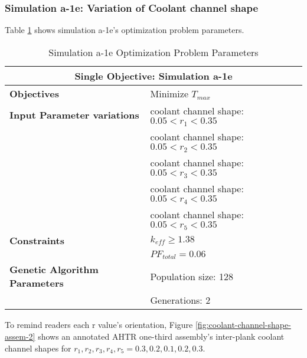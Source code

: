 \subsubsection{Simulation a-1e: Variation of Coolant channel shape}
Table \ref{tab:simulationa1e} shows simulation a-1e's optimization problem parameters. 
\begin{table}[htbp!]
    \centering
    \onehalfspacing
    \caption{Simulation a-1e Optimization Problem Parameters}
	\label{tab:simulationa1e}
    \footnotesize
    \begin{tabular}{l|p{6cm}}
    \hline 
    \multicolumn{2}{c}{\textbf{Single Objective: Simulation a-1e}} \\
    \hline 
    \textbf{Objectives} & Minimize $T_{max}$ \\
    \hline 
    \textbf{Input Parameter variations} 
    & coolant channel shape: $0.05<r_{1}<0.35$ \\
    & coolant channel shape: $0.05<r_{2}<0.35$ \\
    & coolant channel shape: $0.05<r_{3}<0.35$ \\
    & coolant channel shape: $0.05<r_{4}<0.35$ \\
    & coolant channel shape: $0.05<r_{5}<0.35$ \\
    \hline
    \textbf{Constraints} & $k_{eff} \geq 1.38$\\ 
    & $PF_{total} = 0.06 $\\ 
    \hline 
    \textbf{Genetic Algorithm Parameters} & Population size: 128 \\
    & Generations: 2 \\
    \hline
    \end{tabular}
\end{table}
To remind readers each r value's orientation, Figure 
\ref{fig:coolant-channel-shape-assem-2} shows an annotated \gls{AHTR} one-third 
assembly's inter-plank coolant channel shapes for 
$r_1, r_2, r_3, r_4, r_5 = 0.3, 0.2, 0.1, 0.2, 0.3$.

